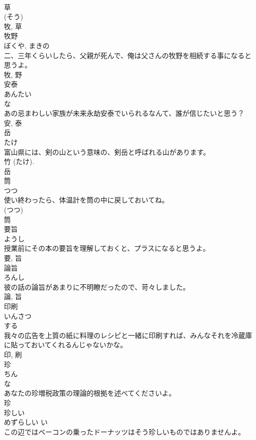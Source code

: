 \documentclass[8pt]{extreport}
\begin{document}
\begin{CJK}{UTF8}{min}
\\	草 
\\	(そう) 
\\	牧, 草	
\\	牧野	
\\	ぼくや, まきの	
\\	二、三年くらいしたら、父親が死んで、俺は父さんの牧野を相続する事になると思うよ。	
\\	牧, 野	
\\	安泰	
\\	あんたい	
\\	な 
\\	あの忌まわしい家族が未来永劫安泰でいられるなんて、誰が信じたいと思う？	
\\	安, 泰	
\\	岳	
\\	たけ	
\\	富山県には、剣の山という意味の、剣岳と呼ばれる山があります。	
\\	竹 (たけ). 
\\	岳	
\\	筒	
\\	つつ	
\\	使い終わったら、体温計を筒の中に戻しておいてね。	
\\	(つつ) 
\\	筒	
\\	要旨	
\\	ようし	
\\	授業前にその本の要旨を理解しておくと、プラスになると思うよ。	
\\	要, 旨	
\\	論旨	
\\	ろんし	
\\	彼の話の論旨があまりに不明瞭だったので、苛々しました。	
\\	論, 旨	
\\	印刷	
\\	いんさつ	
\\	する 
\\	我々の広告を上質の紙に料理のレシピと一緒に印刷すれば、みんなそれを冷蔵庫に貼っておいてくれるんじゃないかな。	
\\	印, 刷	
\\	珍	
\\	ちん	
\\	な 
\\	あなたの珍増税政策の理論的根拠を述べてくださいよ。	
\\	珍	
\\	珍しい	
\\	めずらしい	い 
\\	この辺ではベーコンの乗ったドーナッツはそう珍しいものではありませんよ。	

\end{CJK}
\end{document}
